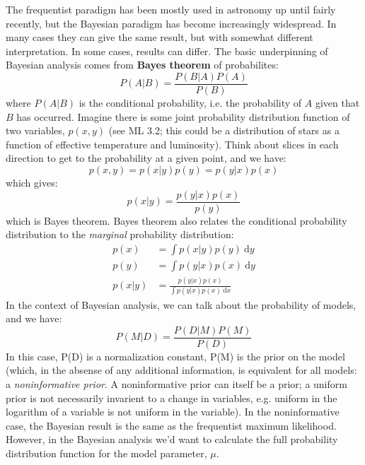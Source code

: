 \documentclass[12pt]{article}
\begin{document}
The frequentist paradigm has been mostly used in astronomy up until fairly
recently, but the Bayesian paradigm has become increasingly widespread. In
many cases they can give the same result, but with somewhat different
interpretation. In some cases, results can differ. The basic underpinning of
Bayesian analysis comes from \textbf{Bayes theorem} of probabilites:
\begin{equation*}
    P(A|B) = \frac{P(B|A)P(A)}{P(B)}
\end{equation*}
where $P(A|B)$ is the conditional probability, i.e. the probability of $A$ given
that $B$ has occurred. Imagine there is some joint probability distribution
function of two variables, $p(x,y)$ (see ML 3.2; this could be a distribution
of stars as a function of effective temperature and luminosity). Think about
slices in each direction to get to the probability at a given point, and we
have:
\begin{equation*}
    p(x,y) = p(x|y)p(y) = p(y|x)p(x)
\end{equation*}
which gives:
\begin{equation*}
    p(x|y) = \frac{p(y|x)p(x)}{p(y)}
\end{equation*}
which is Bayes theorem. Bayes theorem also relates the conditional probability
distribution to the \emph{marginal} probability distribution:
\begin{align*}
    p(x) &= \int \! p(x|y)p(y) \ \mathrm{d}y \\
    p(y) &= \int \! p(y|x)p(x) \ \mathrm{d}y \\
    p(x|y) &= \frac{p(y|x)p(x)}{\int \! p(y|x)p(x) \ \mathrm{d}x}
\end{align*}
In the context of Bayesian analysis, we can talk about the probability of models,
and we have:
\begin{equation*}
    P(M|D) = \frac{P(D|M)P(M)}{P(D)}
\end{equation*}
In this case, P(D) is a normalization constant, P(M) is the prior on the model
(which, in the absense of any additional information, is equivalent for all
models: a \emph{noninformative prior}. A noninformative prior can itself be
a prior; a uniform prior is not necessarily invarient to a change in
variables, e.g. uniform in the logarithm of a variable is not uniform in the
variable). In the noninformative case, the Bayesian result is the same as the
frequentist maximum likelihood. However, in the Bayesian analysis we'd want
to calculate the full probability distribution function for the model parameter,
$\mu$.
\end{document}
